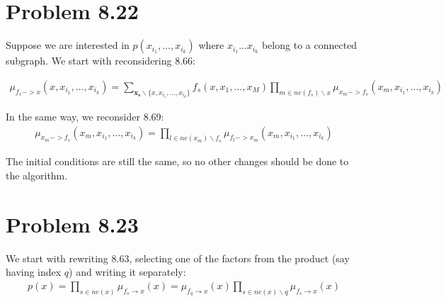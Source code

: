 \documentclass[fleqn]{article}
\begin{document}

\section*{Problem 8.22}

Suppose we are interested in $p(x_{i_1},...,x_{i_k})$ where $x_{i_1}...x_{i_k}$ belong to a connected subgraph.
We start with reconsidering 8.66:

\begin{align}
	\mu_{f_s->x}(x, x_{i_1},...,x_{i_k}) = \sum\limits_{\boldsymbol{x_s} \backslash \{x, x_{i_1},...,x_{i_k}\}}f_s(x, x_1, ..., x_M)\prod\limits_{m \in ne(f_s) \backslash x}\mu_{x_m->f_s}(x_m, x_{i_1},...,x_{i_k})
\end{align}

In the same way, we reconsider 8.69:
\begin{align}
	\mu_{x_m->f_s}(x_m, x_{i_1},...,x_{i_k}) = \prod\limits_{l \in ne(x_m) \backslash f_s}\mu_{f_l->x_m}(x_m, x_{i_1},...,x_{i_k})
\end{align}

The initial conditions are still the same, so no other changes should be done to the algorithm.

\section*{Problem 8.23}

We start with rewriting 8.63, selecting one of the factors from the product (say having index $q$) and writing it separately:
\begin{align}
	p(x) = \prod\limits_{s \in ne(x)} \mu_{f_s\to x} (x) =  \mu_{f_q\to x} (x) \prod\limits_{s \in ne(x) \backslash q} \mu_{f_s\to x} (x) 
\end{align}
\end{document}
